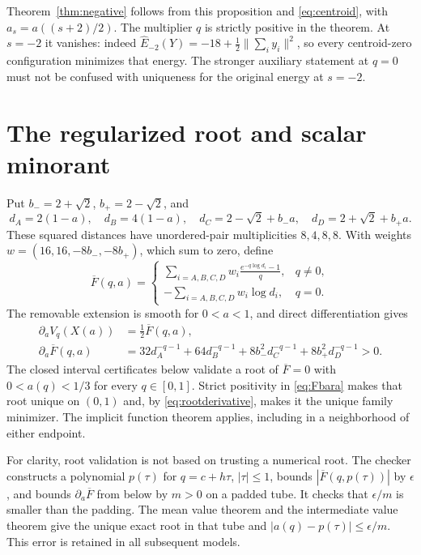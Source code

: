 \documentclass[11pt,reqno]{amsart}
\theoremstyle{remark}\newtheorem{remark}[theorem]{Remark}
\newcommand{\norm}[1]{\lVert#1\rVert}
\newcommand{\Eh}{\widehat E}
\numberwithin{equation}{section}
\begin{document}
Theorem~\ref{thm:negative} follows from this proposition and
\eqref{eq:centroid}, with $a_s=a((s+2)/2)$. The multiplier $q$ is strictly
positive in the theorem. At $s=-2$ it vanishes: indeed
$\Eh_{-2}(Y)=-18+\tfrac12\norm{\sum_i y_i}^2$, so every centroid-zero
configuration minimizes that energy. The stronger auxiliary statement at
$q=0$ must not be confused with uniqueness for the original energy at $s=-2$.

\section{The regularized root and scalar minorant}
Put $b_-=2+\sqrt2$, $b_+=2-\sqrt2$, and
\[
 d_A=2(1-a),\quad d_B=4(1-a),\quad
 d_C=2-\sqrt2+b_-a,\quad d_D=2+\sqrt2+b_+a.
\]
These squared distances have unordered-pair multiplicities $8,4,8,8$.
With weights $w=(16,16,-8b_-,-8b_+)$, which sum to zero, define
\begin{equation}\label{eq:Fbar}
 \overline F(q,a)=\begin{cases}
 \displaystyle\sum_{i=A,B,C,D}w_i\frac{e^{-q\log d_i}-1}{q},&q\ne0,\\[2mm]
 \displaystyle-\sum_{i=A,B,C,D}w_i\log d_i,&q=0.
 \end{cases}
\end{equation}
The removable extension is smooth for $0<a<1$, and direct differentiation gives
\begin{align}
 \partial_a V_q(X(a))&=\tfrac12\overline F(q,a),\label{eq:rootderivative}\\
 \partial_a\overline F(q,a)
 &=32d_A^{-q-1}+64d_B^{-q-1}
   +8b_-^2d_C^{-q-1}+8b_+^2d_D^{-q-1}>0.\label{eq:Fbara}
\end{align}
The closed interval certificates below validate a root of $\overline F=0$
with $0<a(q)<1/3$ for every $q\in[0,1]$. Strict positivity in
\eqref{eq:Fbara} makes that root unique on $(0,1)$ and, by
\eqref{eq:rootderivative}, makes it the unique family minimizer. The implicit
function theorem applies, including in a neighborhood of either endpoint.

For clarity, root validation is not based on trusting a numerical root.
The checker constructs a polynomial $p(\tau)$ for $q=c+h\tau$, $|\tau|\le1$,
bounds $|\overline F(q,p(\tau))|$ by $\epsilon$, and bounds
$\partial_a\overline F$ from below by $m>0$ on a padded tube. It checks that
$\epsilon/m$ is smaller than the padding. The mean value theorem and the
intermediate value theorem give the unique exact root in that tube and
$|a(q)-p(\tau)|\le\epsilon/m$. This error is retained in all subsequent models.
\end{document}
